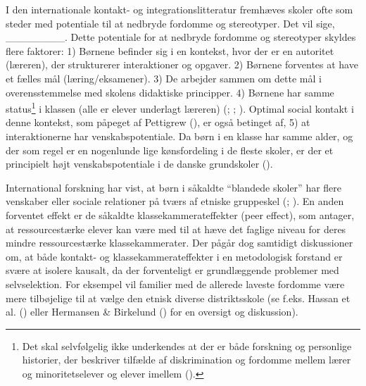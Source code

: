 \documentclass[
]{book}
\begin{document}
I den internationale kontakt- og integrationslitteratur fremhæves skoler ofte som steder med potentiale til at nedbryde fordomme og stereotyper. Det vil sige, \_\_\_\_\_\_\_\_. Dette potentiale for at nedbryde fordomme og stereotyper skyldes flere faktorer: 1) Børnene befinder sig i en kontekst, hvor der er en autoritet (læreren), der strukturerer interaktioner og opgaver. 2) Børnene forventes at have et fælles mål (læring/eksamener). 3) De arbejder sammen om dette mål i overensstemmelse med skolens didaktiske principper. 4) Børnene har samme status\footnote{Det skal selvfølgelig ikke underkendes at der er både forskning og personlige historier, der beskriver tilfælde af diskrimination og fordomme mellem lærer og minoritetselever og elever imellem ().} i klassen (alle er elever underlagt læreren) (; ; ). Optimal social kontakt i denne kontekst, som påpeget af Pettigrew (), er også betinget af, 5) at interaktionerne har venskabspotentiale. Da børn i en klasse har samme alder, og der som regel er en nogenlunde lige kønsfordeling i de fleste skoler, er der et principielt højt venskabspotentiale i de danske grundskoler ().

International forskning har vist, at børn i såkaldte ``blandede skoler'' har flere venskaber eller sociale relationer på tværs af etniske gruppeskel (; ). En anden forventet effekt er de såkaldte klassekammerateffekter (peer effect), som antager, at ressourcestærke elever kan være med til at hæve det faglige niveau for deres mindre ressourcestærke klassekammerater. Der pågår dog samtidigt diskussioner om, at både kontakt- og klassekammerateffekter i en metodologisk forstand er svære at isolere kausalt, da der forventeligt er grundlæggende problemer med selvselektion. For eksempel vil familier med de allerede laveste fordomme være mere tilbøjelige til at vælge den etnisk diverse distriktsskole (se f.eks. Hassan et al. () eller Hermansen \& Birkelund () for en oversigt og diskussion).
\end{document}
